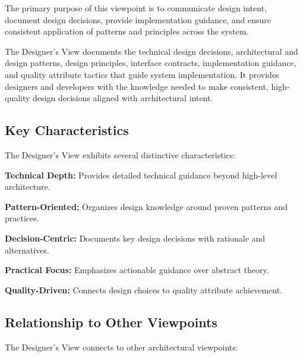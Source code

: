 \documentclass[11pt,letterpaper]{article}
\begin{document}
The primary purpose of this viewpoint is to communicate design intent, document design decisions, provide implementation guidance, and ensure consistent application of patterns and principles across the system.

\begin{definitionbox}
The Designer's View documents the technical design decisions, architectural and design patterns, design principles, interface contracts, implementation guidance, and quality attribute tactics that guide system implementation. It provides designers and developers with the knowledge needed to make consistent, high-quality design decisions aligned with architectural intent.
\end{definitionbox}

\subsection{Key Characteristics}

The Designer's View exhibits several distinctive characteristics:

\textbf{Technical Depth:} Provides detailed technical guidance beyond high-level architecture.

\textbf{Pattern-Oriented:} Organizes design knowledge around proven patterns and practices.

\textbf{Decision-Centric:} Documents key design decisions with rationale and alternatives.

\textbf{Practical Focus:} Emphasizes actionable guidance over abstract theory.

\textbf{Quality-Driven:} Connects design choices to quality attribute achievement.

\subsection{Relationship to Other Viewpoints}

The Designer's View connects to other architectural viewpoints:
\end{document}
